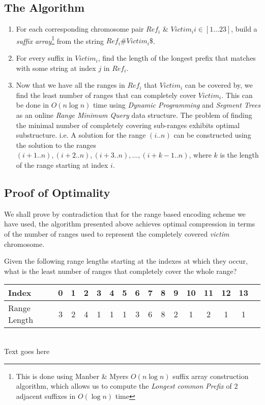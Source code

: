 \documentclass[11pt]{article}
\begin{document}
\subsection{The Algorithm}

\begin{enumerate}

\item For each corresponding chromosome pair ${Ref}_i$ \& $Victim_i i
  \in [1\ldots{}23]$, build a
  \textit{suffix array}\footnote{This is done using Manber \& Myers
    $O(n\log{n})$ suffix array construction
    algorithm\cite{manbermyers}, which allows us to compute the
    \textit{Longest common Prefix} of 2 adjacent suffixes in
    $O(\log{n})$ time} from the string $Ref_i\#Victim_i\$$.

\item For every suffix in ${Victim}_i$, find the length of the longest
  prefix that matches with some string at index $j$ in ${Ref}_i$.

\item Now that we have all the ranges in $Ref_i$ that $Victim_i$ can
  be covered by, we find the least number of ranges that can
  completely cover $Victim_i$. This can be done in $O(n\log{n})$ time
  using \textit{Dynamic Programming} and \textit{Segment Trees} as an
  online \textit{Range Minimum Query} data structure. The problem of
  finding the minimal number of completely covering sub-ranges
  exhibits optimal substructure. i.e. A solution for the range
  $(i..n)$ can be constructed using the solution to the ranges
  $(i+1..n), (i+2..n), (i+3..n), \ldots{}, (i+k-1..n)$, where $k$ is
  the length of the range starting at index $i$.

\end{enumerate}

\subsection{Proof of Optimality}

We shall prove by contradiction that for the range based encoding
scheme we have used, the algorithm presented above achieves optimal
compression in terms of the number of ranges used to represent the
completely covered \textit{victim} chromosome.

Given the following range lengths starting at the indexes at which
they occur, what is the least number of ranges that completely cover
the whole range?

\begin{center}
  \begin{tabular}{|l|c|c|c|c|c|c|c|c|c|c|c|c|c|c|c|}
    \hline
    Index        & 0 & 1 & 2 & 3 & 4 & 5 & 6 & 7 & 8 & 9 &10 &11 &12 &13\\
    \hline
    Range Length & 3 & 2 & 4 & 1 & 1 & 1 & 3 & 6 & 8 & 2 & 1 & 2 & 1 & 1\\
    \hline
  \end{tabular}\\
  \vspace{0.3cm}
  Text goes here
\end{center}
\end{document}
